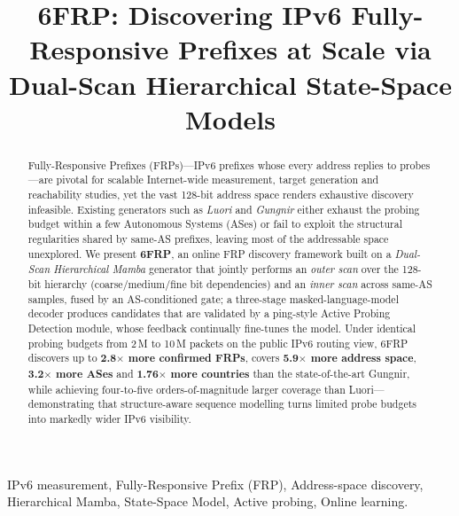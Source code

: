 
\title{6FRP: Discovering IPv6 Fully-Responsive Prefixes at Scale via
       Dual-Scan Hierarchical State-Space Models}

\begin{abstract}
Fully-Responsive Prefixes (FRPs)---IPv6 prefixes whose every address replies
to probes---are pivotal for scalable Internet-wide measurement, target
generation and reachability studies, yet the vast 128-bit address space
renders exhaustive discovery infeasible. Existing generators such as
\emph{Luori} and \emph{Gungnir} either exhaust the probing budget within a
few Autonomous Systems (ASes) or fail to exploit the structural regularities
shared by same-AS prefixes, leaving most of the addressable space
unexplored. We present \textbf{6FRP}, an online FRP discovery framework
built on a \emph{Dual-Scan Hierarchical Mamba} generator that jointly
performs an \emph{outer scan} over the 128-bit hierarchy
(coarse/medium/fine bit dependencies) and an \emph{inner scan} across
same-AS samples, fused by an AS-conditioned gate; a three-stage
masked-language-model decoder produces candidates that are validated by a
ping-style Active Probing Detection module, whose feedback continually
fine-tunes the model. Under identical probing budgets from 2\,M to 10\,M
packets on the public IPv6 routing view, 6FRP discovers up to
\textbf{2.8$\times$ more confirmed FRPs}, covers \textbf{5.9$\times$ more
address space}, \textbf{3.2$\times$ more ASes} and \textbf{1.76$\times$
more countries} than the state-of-the-art Gungnir, while achieving
four-to-five orders-of-magnitude larger coverage than Luori---demonstrating
that structure-aware sequence modelling turns limited probe budgets into
markedly wider IPv6 visibility.
\end{abstract}

\begin{IEEEkeywords}
IPv6 measurement, Fully-Responsive Prefix (FRP), Address-space discovery,
Hierarchical Mamba, State-Space Model, Active probing, Online learning.
\end{IEEEkeywords}


